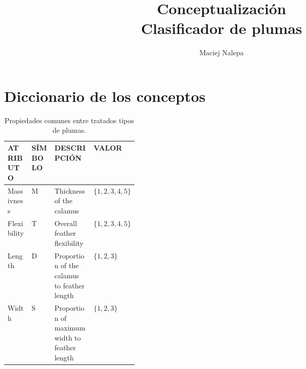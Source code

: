 \documentclass[a4paper,12pt]{article}
\title{Conceptualización\\ \normalsize{Clasificador de plumas}}
\author{Maciej Nalepa}
\begin{document}
\maketitle

\section{Diccionario de los conceptos}
\begin{table}[H]
	\centering
	\begin{tabular}{|l|l|p{0.3\linewidth}|l|}
		\hline
		ATRIBUTO    & SÍMBOLO & DESCRIPCIÓN                                   & VALOR           \\ \hline\hline
		Massivness  & M       & Thickness of the calamus                      & $\{1,2,3,4,5\}$ \\ \hline
		Flexibility & T       & Overall feather flexibility                   & $\{1,2,3,4,5\}$ \\ \hline
		Length      & D       & Proportion of the calamus to feather length   & $\{1,2,3\}$     \\ \hline
		Width       & S       & Proportion of maximum width to feather length & $\{1,2,3\}$     \\ \hline
	\end{tabular}
	\caption{Propiedades comunes entre tratados tipos de plumas.}
\end{table}
\end{document}
